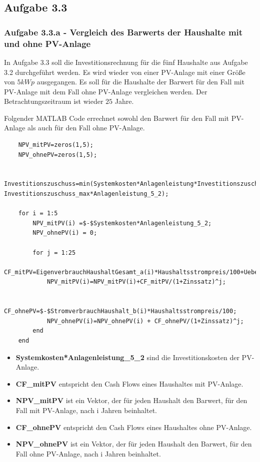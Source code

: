 \documentclass[a4paper,12pt]{article}
\begin{document}
	\subsection{Aufgabe 3.3}
	\subsubsection{Aufgabe 3.3.a - Vergleich des Barwerts der Haushalte mit und ohne PV-Anlage}
	In Aufgabe 3.3 soll die Investitionsrechnung für die fünf Haushalte aus Aufgabe 3.2 durchgeführt werden. Es wird wieder von einer PV-Anlage mit einer Größe von $5kWp$ ausgegangen.\newline
	Es soll für die Haushalte der Barwert für den Fall mit PV-Anlage mit dem Fall ohne PV-Anlage vergleichen werden. Der Betrachtungszeitraum ist wieder $25$ Jahre.\\ \par
	\noindent Folgender MATLAB Code errechnet sowohl den Barwert für den Fall mit PV-Anlage als auch für den Fall ohne PV-Anlage.
	\begin{lstlisting}
	NPV_mitPV=zeros(1,5);
	NPV_ohnePV=zeros(1,5);
	
	Investitionszuschuss=min(Systemkosten*Anlagenleistung*Investitionszuschuss_prozent, Investitionszuschuss_max*Anlagenleistung_5_2);
	
	for i = 1:5
		NPV_mitPV(i) =$-$Systemkosten*Anlagenleistung_5_2;
		NPV_ohnePV(i) = 0;

		for j = 1:25
			CF_mitPV=EigenverbrauchHaushaltGesamt_a(i)*Haushaltsstrompreis/100+UeberschussHaushalt_a(i)*Einspeisetarif_5_3/100+Investitionszuschuss$-$(StromverbrauchHaushalt_b(i)$-$EigenverbrauchHaushaltGesamt_a(i))*Haushaltsstrompreis/100$-$Betriebskosten*Anlagenleistung;
			NPV_mitPV(i)=NPV_mitPV(i)+CF_mitPV/(1+Zinssatz)^j;
			
			CF_ohnePV=$-$StromverbrauchHaushalt_b(i)*Haushaltsstrompreis/100;
			NPV_ohnePV(i)=NPV_ohnePV(i) + CF_ohnePV/(1+Zinssatz)^j;
		end
	end
	\end{lstlisting}
	\begin{itemize}
		\item \textbf{Systemkosten*Anlagenleistung\_5\_2} sind die Investitionskosten der PV-Anlage.
		\item \textbf{CF\_mitPV} entspricht den Cash Flows eines Haushaltes mit PV-Anlage.
		\item \textbf{NPV\_mitPV} ist ein Vektor, der für jeden Haushalt den Barwert, für den Fall mit PV-Anlage, nach i Jahren beinhaltet.
		\item \textbf{CF\_ohnePV} entspricht den Cash Flows eines Haushaltes ohne PV-Anlage.
		\item \textbf{NPV\_ohnePV} ist ein Vektor, der für jeden Haushalt den Barwert, für den Fall ohne PV-Anlage, nach i Jahren beinhaltet.
	\end{itemize}
\end{document}

